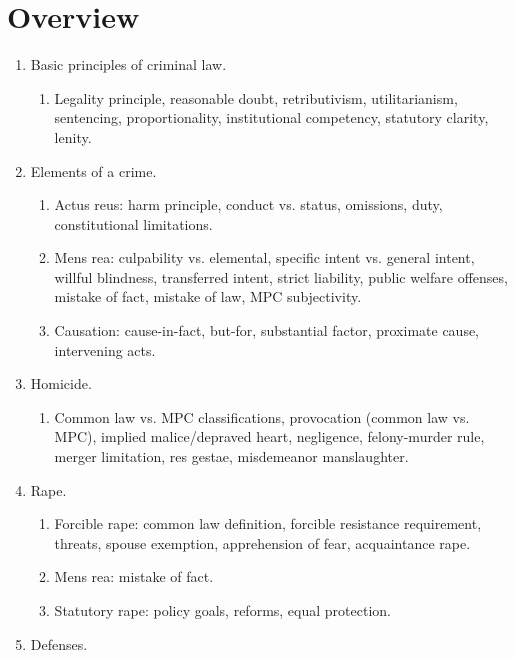 \section{Overview}

\begin{enumerate}
    \item Basic principles of criminal law.
    \begin{enumerate}
        \item Legality principle, reasonable doubt, retributivism, 
        utilitarianism, sentencing, proportionality, institutional competency, 
        statutory clarity, lenity.
    \end{enumerate}
    \item Elements of a crime.
    \begin{enumerate}
        \item Actus reus: harm principle, conduct vs. status, omissions, duty, 
        constitutional limitations.
        \item Mens rea: culpability vs. elemental, specific intent vs. general 
        intent, willful blindness, transferred intent, strict liability, 
        public welfare offenses, mistake of fact, mistake of law, MPC 
        subjectivity.
        \item Causation: cause-in-fact, but-for, substantial factor, proximate 
        cause, intervening acts.
    \end{enumerate}
    \item Homicide.
    \begin{enumerate}
        \item Common law vs. MPC classifications, provocation (common law vs. 
        MPC), implied malice/depraved heart, negligence, felony-murder rule, 
        merger limitation, res gestae, misdemeanor manslaughter.
    \end{enumerate}
    \item Rape.
    \begin{enumerate}
        \item Forcible rape: common law definition, forcible resistance 
        requirement, threats, spouse exemption, apprehension of fear, 
        acquaintance rape.
        \item Mens rea: mistake of fact.
        \item Statutory rape: policy goals, reforms, equal protection.
    \end{enumerate}
    \item Defenses.
    \begin{enumerate}

\end{enumerate}
\end{enumerate}
